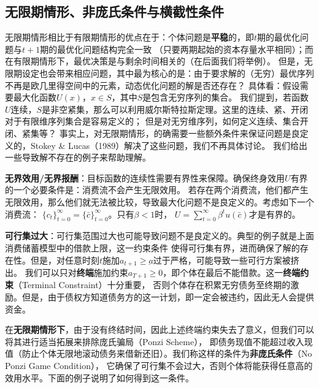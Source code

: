 \subsection{无限期情形、非庞氏条件与横截性条件}

无限期情形相比于有限期情形的优点在于：个体问题是\textbf{平稳}的，即$t$期的最优化问题与$t+1$期的最优化问题结构完全一致
（只要两期起始的资本存量水平相同）；而在有限期情形下，最优决策是与剩余时间相关的（在后面我们将举例）。
但是，无限期设定也会带来相应问题，其中最为核心的是：由于要求解的（无穷）最优序列不再是欧几里得空间中的元素，动态优化问题的解是否还存在？
具体看：假设需要最大化函数$U(x)$，$x\in S$，其中$S$是包含无穷序列的集合。
我们提到，若函数$U$连续，$S$是非空紧集，那么可以利用威尔斯特拉斯定理。这里的连续、紧、开闭对于有限维序列集合是容易定义的；
但是对无穷维序列，如何定义连续、集合开闭、紧集等？
事实上，对无限期情形，的确需要一些额外条件来保证问题是良定义的，Stokey \& Lucas（1989）解决了这些问题，我们不再具体讨论。
我们给出一些导致解不存在的例子来帮助理解。

\begin{example}
    \textbf{无界效用/无界报酬}：目标函数的连续性需要有界性来保障。确保终身效用$U$有界的一个必要条件是：消费流不会产生无限效用。
    若存在两个消费流，他们都产生无限效用，那么他们就无法被比较，导致最大化问题不是良定义的。考虑如下一个消费流：
    $\{c_t\}_{t=0}^{\infty} = \{\bar{c}\}_{t=0}^{\infty}$。只有$\beta<1$时，
    $U = \sum_{t=0}^{\infty}\beta^t u(\bar{c})$才是有界的。
\end{example}

\begin{example}
    \textbf{可行集过大}：可行集范围过大也可能导致问题不是良定义的。典型的例子就是上面消费储蓄模型中的借款上限，这一约束条件
    使得可行集有界，进而确保了解的存在性。但是，对任意时刻$t$施加$a_{t+1}\geq\underbar{a}$过于严格，可能导致一些可行方案被挤出。
    我们可以只对\textbf{终端}施加约束$a_{T+1}\geq 0$，即个体在最后不能借款。这一\textbf{终端约束}（Terminal Constraint）十分重要，
    否则个体存在积累无穷债务至终期的激励。但是，由于债权方知道债务方的这一计划，即一定会被违约，因此无人会提供资金。

    在\textbf{无限期情形下}，由于没有终结时间，因此上述终端约束失去了意义，但我们可以将其进行适当拓展来排除庞氏骗局（Ponzi Scheme），
    即债务现值不能超过收入现值（防止个体无限地滚动债务来借新还旧）。我们称这样的条件为\textbf{非庞氏条件}（No Ponzi Game Condition），
    它确保了可行集不会过大，否则个体将能获得任意高的效用水平。下面的例子说明了如何得到这一条件。
\end{example}

